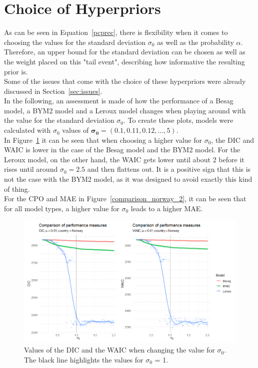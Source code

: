 \section{Choice of Hyperpriors}\label{sec:hyperprios}
As can be seen in Equation~\ref{pcprec}, there is flexibility when it comes to choosing the values for the standard deviation $\sigma_0$ as well as the probability $\alpha$. Therefore, an upper bound for the standard deviation can be chosen as well as the weight placed on this "tail event", describing how informative the resulting prior is. \\
Some of the issues that come with the choice of these hyperpriors were already discussed in Section~\ref{sec:issues}. \\
In the following, an assessment is made of how the performance of a Besag model, a BYM2 model and a Leroux model changes when playing around with the value for the standard deviation $\sigma_0$. To create these plots, models were calculated with $\sigma_0$ values of $\pmb{\sigma_0}=\left(0.1,0.11,0.12,...,5\right)$.\\
In Figure~\ref{comparison_norway_1} it can be seen that when choosing a higher value for $\sigma_0$, the DIC and WAIC is lower in the case of the Besag model and the BYM2 model. For the Leroux model, on the other hand, the WAIC gets lower until about 2 before it rises until around $\sigma_0 = 2.5$ and then flattens out. It is a positive sign that this is not the case with the BYM2 model, as it was designed to avoid exactly this kind of thing. \\
For the CPO and MAE in Figure~\ref{comparison_norway_2}, it can be seen that for all model types, a higher value for $\sigma_0$ leads to a higher MAE.
\begin{figure}[H]
  \centering
  \includegraphics[width = \textwidth]{comparison_1_norway.png}
  \caption{Values of the DIC and the WAIC when changing the value for $\sigma_0$. The black line highlights the values for $\sigma_0$ = 1.}
  \label{comparison_norway_1}
\end{figure}
